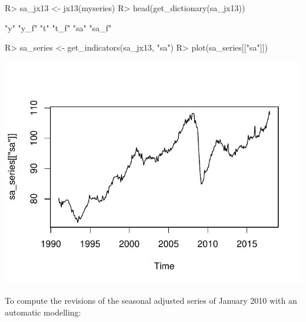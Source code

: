 \documentclass[article]{jss}
\begin{document}
\begin{CodeChunk}

\begin{CodeInput}
R> sa_jx13 <- jx13(myseries)
R> head(get_dictionary(sa_jx13))
\end{CodeInput}

\begin{CodeOutput}
[1] "y"    "y_f"  "t"    "t_f"  "sa"   "sa_f"
\end{CodeOutput}

\begin{CodeInput}
R> sa_series <- get_indicators(sa_jx13, "sa")
R> plot(sa_series[["sa"]])
\end{CodeInput}


\begin{center}\includegraphics{img/img-unnamed-chunk-27-1} \end{center}

\end{CodeChunk}

To compute the revisions of the seasonal adjusted series of January 2010
with an automatic modelling:
\end{document}
